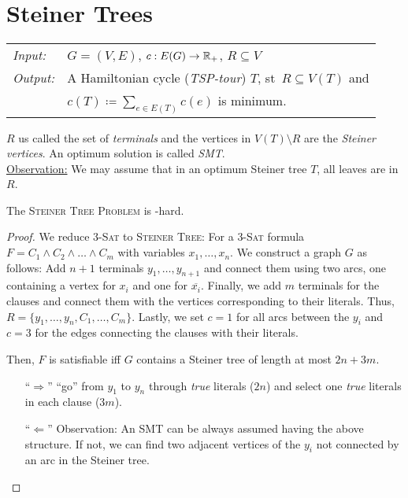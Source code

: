 \documentclass[../skript.tex]{subfiles}
\begin{document}
\chapter{Steiner Trees} %
\label{sec:c5}
\begin{problem}
\begin{tabular}{@{}ll}
\textit{Input:} & $G = (V, E)$, $c : E(G) \to \mathbb{R}_+$, $R \subseteq V$ \\
\textit{Output:} & A Hamiltonian cycle (\emph{TSP-tour}) $T$, \ac{st}\ $R \subseteq V(T)$ and \\
& $c(T) \coloneqq \sum_{e \in E(T)} c(e)$ is minimum.
\end{tabular}
\end{problem}
$R$ us called the set of \emph{terminals} and the vertices in $V(T) \setminus R$ are the \emph{Steiner vertices}. An optimum solution is called \emph{\ac{SMT}}. \\
\underline{Observation:} We may assume that in an optimum Steiner tree $T$, all leaves are in $R$.
\begin{theorem} %
\label{thm:61}
The \textsc{Steiner Tree Problem} is \NP-hard.
\end{theorem}
\begin{proof}
We reduce \textsc{3-Sat} to \textsc{Steiner Tree}:
For a \textsc{3-Sat} formula $F = C_1 \wedge C_2 \wedge \ldots \wedge C_m$ with variables $x_1, \ldots, x_n$.
We construct a graph $G$ as follows: Add $n+1$ terminals $y_1, \ldots, y_{n+1}$ and connect them using two arcs, one containing a vertex for $x_i$ and one for $\overline{x_i}$. Finally, we add $m$ terminals for the clauses and connect them with the vertices corresponding to their literals. Thus, $R = \{ y_1, \ldots, y_n, C_1, \ldots, C_m\}$. Lastly, we set $c = 1$ for all arcs between the $y_i$ and $c = 3$ for the edges connecting the clauses with their literals.

Then, $F$ is satisfiable \ac{iff} $G$ contains a Steiner tree of length at most $2n + 3m$.
\begin{itemize}
\item[``$\Rightarrow$''] ``go'' from $y_1$ to $y_n$ through \textit{true} literals ($2n$) and select one \textit{true} literals in each clause ($3m$).
\item[``$\Leftarrow$''] Observation: An \ac{SMT} can be always assumed having the above structure. If not, we can find two adjacent vertices of the $y_i$ not connected by an arc in the Steiner tree.
\end{itemize}
\end{proof}
\end{document}
